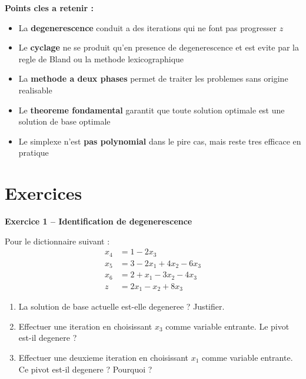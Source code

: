 \documentclass[12pt,a4paper]{article}
\begin{document}
\begin{astuce}
\textbf{Points cles a retenir :}

\begin{itemize}
    \item La \textcolor{importantrouge}{\textbf{degenerescence}} conduit a des iterations qui ne font pas progresser $z$
    \item Le \textcolor{importantrouge}{\textbf{cyclage}} ne se produit qu'en presence de degenerescence et est evite par la regle de Bland ou la methode lexicographique
    \item La \textcolor{titrebleu}{\textbf{methode a deux phases}} permet de traiter les problemes sans origine realisable
    \item Le \textcolor{defvert}{\textbf{theoreme fondamental}} garantit que toute solution optimale est une solution de base optimale
    \item Le simplexe n'est \textcolor{importantrouge}{\textbf{pas polynomial}} dans le pire cas, mais reste tres efficace en pratique
\end{itemize}
\end{astuce}

\section{Exercices}

\begin{exemple}
\textbf{Exercice 1 -- Identification de degenerescence}

Pour le dictionnaire suivant :
\begin{align*}
x_4 &= 1 - 2x_3\\
x_5 &= 3 - 2x_1 + 4x_2 - 6x_3\\
x_6 &= 2 + x_1 - 3x_2 - 4x_3\\
z &= 2x_1 - x_2 + 8x_3
\end{align*}

\begin{enumerate}
    \item La solution de base actuelle est-elle degeneree ? Justifier.
    \item Effectuer une iteration en choisissant $x_3$ comme variable entrante. Le pivot est-il degenere ?
    \item Effectuer une deuxieme iteration en choisissant $x_1$ comme variable entrante. Ce pivot est-il degenere ? Pourquoi ?
\end{enumerate}
\end{exemple}
\end{document}
